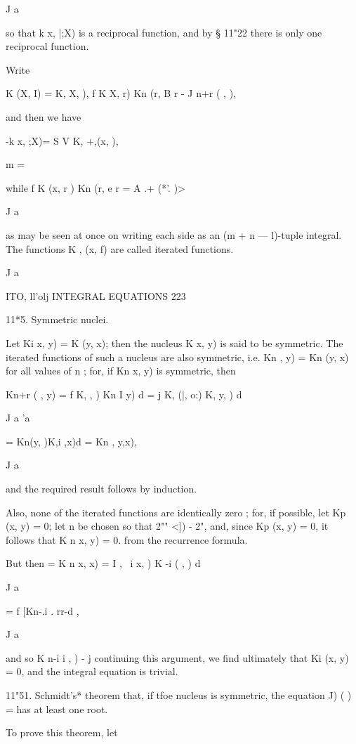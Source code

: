 {J a 

so that k  x, |;X) is a reciprocal function, and by § 11"22 there is only one 
reciprocal function. 

Write 

K (X, I) = K,  X,  ), f K  X, r) Kn (r, B  r - J n+r ( ,  ), 

and then we have 

-k x, ;X)= S V K, +,(x, ), 

m = 

while f K  (x, r ) Kn (r, e  r = A .+  (*'.  )> 

J a 

as may be seen at once on writing each side as an (m + n — l)-tuple integral. 
The functions K , (x, f) are called iterated functions. 



J a 



ITO, ll'olj INTEGRAL EQUATIONS 223 

11*5. Symmetric nuclei. 

Let Ki  x, y) = K  (y, x); then the nucleus K x, y) is said to be symmetric. 
The iterated functions of such a nucleus are also symmetric, i.e. 
Kn   , y) = Kn (y, x) for all values of n ; for, if Kn  x, y) is symmetric, then 

Kn+r ( , y) = f K,   ,  ) Kn  I y) d  = j  K, (|, o:) K,  y,  ) d  

J a  'a 

= Kn(y, )K,i ,x)d  = Kn , y,x), 

J a 

and the required result follows by induction. 

Also, none of the iterated functions are identically zero ; for, if possible, let 
Kp (x, y) = 0; let n be chosen so that 2""  <]) -  2", and, since Kp (x, y) = 0, it 
follows that K n  x, y) = 0. from the recurrence formula. 

But then = K n  x, x) = I  , \ i  x,  ) K -i ( ,  ) d  

J a 

= f [Kn-.i . rr-d , 

J a 

and so K n-i i ,  ) -   j continuing this argument, we find ultimately that 
Ki (x, y) = 0, and the integral equation is trivial. 

11"51. Schmidt's* theorem that, if tfoe nucleus is symmetric, the equation 
J) ( )  = has at least one root. 

To prove this theorem, let 

}
